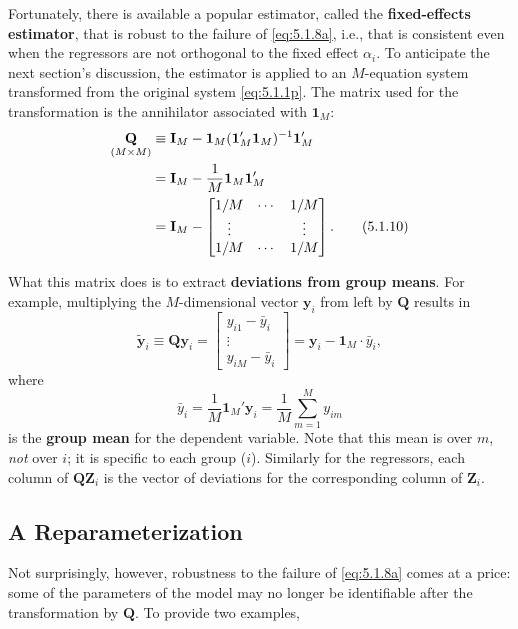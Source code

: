 Fortunately, there is available a popular estimator, called the \textbf{fixed-effects estimator},
that is robust to the failure of \eqref{eq:5.1.8a}, i.e., that is consistent even when the
regressors are not orthogonal to the fixed effect $\alpha_i$. To anticipate the next section's
discussion, the estimator is applied to an $M$-equation system transformed from the
original system \eqref{eq:5.1.1p}. The matrix used for the transformation is the annihilator
associated with $\mathbf{1}_M$:
\begin{align}
  \underset{(M \times M)}{\mathbf{Q}}
  &\equiv \mathbf{I}_M - \mathbf{1}_M (\mathbf{1}_M' \mathbf{1}_M)^{-1} \mathbf{1}_M'
  \notag \\
  &= \mathbf{I}_M - \frac{1}{M} \mathbf{1}_M \mathbf{1}_M'
  \notag \\
  &= \mathbf{I}_M - \begin{bmatrix}
    1/M & \cdots & 1/M \\
    \vdots &        & \vdots \\
    1/M & \cdots & 1/M
  \end{bmatrix}.
  \label{eq:5.1.10} \tag{5.1.10}
\end{align}

What this matrix does is to extract \textbf{deviations from group means}. For example,
multiplying the $M$-dimensional vector $\mathbf{y}_i$ from left by $\mathbf{Q}$ results in
\begin{equation}
  \tilde{\mathbf{y}}_i \equiv \mathbf{Q}\mathbf{y}_i
  = \begin{bmatrix} y_{i1} - \bar{y}_i \\ \vdots \\ y_{iM} - \bar{y}_i \end{bmatrix}
  = \mathbf{y}_i - \mathbf{1}_M \cdot \bar{y}_i,
  \label{eq:5.1.11} \tag{5.1.11}
\end{equation}
where
\[
  \bar{y}_i = \frac{1}{M} \mathbf{1}_M' \mathbf{y}_i
  = \frac{1}{M} \sum_{m=1}^{M} y_{im}
\]
is the \textbf{group mean} for the dependent variable. Note that this mean is over $m$, \emph{not}
over $i$; it is specific to each group ($i$). Similarly for the regressors, each column of
$\mathbf{Q}\mathbf{Z}_i$ is the vector of deviations for the corresponding column of $\mathbf{Z}_i$.

\subsection*{A Reparameterization}

Not surprisingly, however, robustness to the failure of \eqref{eq:5.1.8a} comes at a price:
some of the parameters of the model may no longer be identifiable after the transformation
by $\mathbf{Q}$. To provide two examples,

